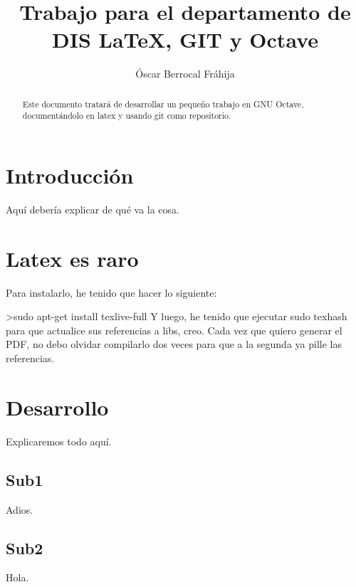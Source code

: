 \documentclass[a4,12pt]{article}
\title{Trabajo para el departamento de DIS \newline
\LaTeX, GIT y Octave}
\author{Óscar Berrocal Fráhija}
\begin{document}
\maketitle



\begin{abstract}
Este documento tratará de desarrollar un pequeño trabajo en GNU Octave, documentándolo en latex y usando git como repositorio.
\end{abstract}

\tableofcontents

\newpage

\section{Introducción}

Aquí debería explicar de qué va la cosa.

\section{Latex es raro}
Para instalarlo, he tenido que hacer lo siguiente:\newline

>sudo apt-get install texlive-full\newline
Y luego, he tenido que ejecutar sudo texhash para que actualice sus referencias a libs, creo.\newline
Cada vez que quiero generar el PDF, no debo olvidar compilarlo dos veces para que a la segunda ya pille las referencias.


\section{Desarrollo}

Explicaremos todo aquí.

\subsection{Sub1}

Adios.

\subsection{Sub2}

Hola.


%
%
\end{document}
